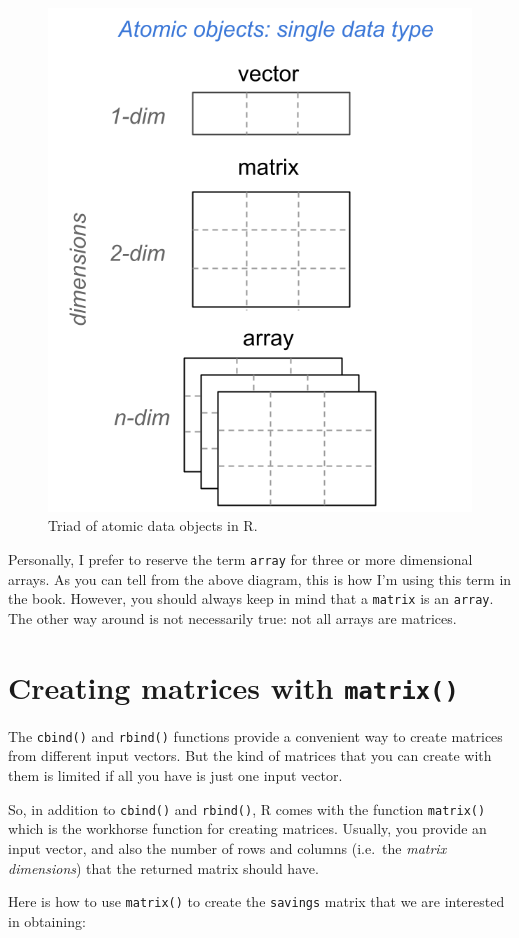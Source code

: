 \documentclass[
]{book}
\begin{document}
\begin{figure}

{\centering \includegraphics[width=0.5\linewidth]{images/objects/obj-atomics} 

}

\caption{Triad of atomic data objects in R.}\label{fig:unnamed-chunk-104}
\end{figure}

Personally, I prefer to reserve the term \texttt{array} for three or more dimensional
arrays. As you can tell from the above diagram, this is how I'm using this
term in the book. However, you should always keep in mind that a \texttt{matrix} is an
\texttt{array}. The other way around is not necessarily true: not all arrays are
matrices.

\hypertarget{creating-matrices-with-matrix}{%
\section{\texorpdfstring{Creating matrices with \texttt{matrix()}}{Creating matrices with matrix()}}\label{creating-matrices-with-matrix}}

The \texttt{cbind()} and \texttt{rbind()} functions provide a convenient way to create
matrices from different input vectors. But the kind of matrices that you can
create with them is limited if all you have is just one input vector.

So, in addition to \texttt{cbind()} and \texttt{rbind()}, R comes with the function \texttt{matrix()}
which is the workhorse function for creating matrices. Usually, you provide
an input vector, and also the number of rows and columns (i.e.~the
\emph{matrix dimensions}) that the returned matrix should have.

Here is how to use \texttt{matrix()} to create the \texttt{savings} matrix that we are
interested in obtaining:
\end{document}

